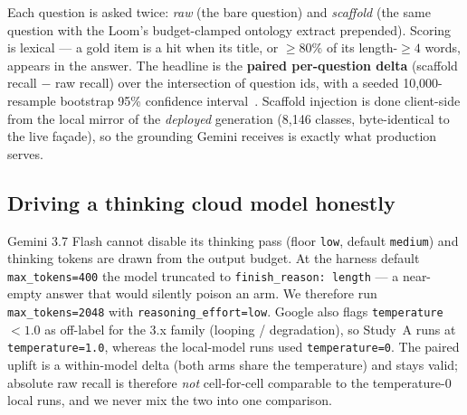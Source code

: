 \documentclass[11pt]{article}
\begin{document}
Each question is asked twice: \emph{raw} (the bare question) and \emph{scaffold} (the same
question with the Loom's budget-clamped ontology extract prepended). Scoring is lexical --- a gold
item is a hit when its title, or $\geq 80\%$ of its length-$\geq 4$ words, appears in the answer.
The headline is the \textbf{paired per-question delta} (scaffold recall $-$ raw recall) over the
intersection of question ids, with a seeded 10{,}000-resample bootstrap 95\% confidence
interval~\cite{efron1993bootstrap}. Scaffold injection is done client-side from the local mirror
of the \emph{deployed} generation (8{,}146 classes, byte-identical to the live façade), so the
grounding Gemini receives is exactly what production serves.

\subsection{Driving a thinking cloud model honestly}
Gemini 3.7 Flash cannot disable its thinking pass (floor \texttt{low}, default \texttt{medium})
and thinking tokens are drawn from the output budget. At the harness default
\texttt{max\_tokens=400} the model truncated to \texttt{finish\_reason: length} --- a near-empty
answer that would silently poison an arm. We therefore run \texttt{max\_tokens=2048} with
\texttt{reasoning\_effort=low}. Google also flags \texttt{temperature}${}<1.0$ as off-label for
the 3.x family (looping / degradation), so Study~A runs at \texttt{temperature=1.0}, whereas the
local-model runs used \texttt{temperature=0}. The paired uplift is a within-model delta (both arms
share the temperature) and stays valid; absolute raw recall is therefore \emph{not} cell-for-cell
comparable to the temperature-0 local runs, and we never mix the two into one comparison.
\end{document}

